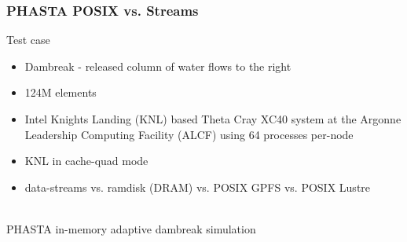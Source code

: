 \documentclass{beamer}
\begin{document}
\begin{frame}
  \frametitle{PHASTA POSIX vs. Streams}
  Test case
  \begin{itemize}
    \item Dambreak - released column of water flows to the right
    \item 124M elements
    \item Intel Knights Landing (KNL) based Theta Cray XC40 system at
      the Argonne Leadership Computing Facility (ALCF) using 64
      processes per-node
    \item KNL in cache-quad mode
    \item data-streams vs. ramdisk (DRAM) vs. POSIX GPFS vs. POSIX Lustre
  \end{itemize}
  \centering
  \\
  \tiny
  PHASTA in-memory adaptive dambreak simulation
\end{frame}
\end{document}
